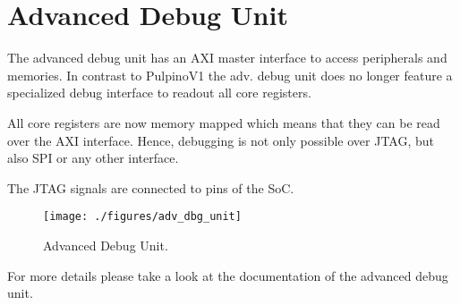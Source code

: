 \chapter{Advanced Debug Unit}

The advanced debug unit has an AXI master interface to access peripherals and
memories. In contrast to PulpinoV1 the adv. debug unit does no longer feature
 a specialized debug interface to readout all core registers.

All core registers are now memory mapped which means that they can be read over
 the AXI interface. Hence, debugging is not only possible over JTAG, but also SPI
 or any other interface.

The JTAG signals are connected to pins of the SoC.

\begin{figure}[H]
  \centering
  \texttt{[image: ./figures/adv\_dbg\_unit]}
  \caption{Advanced Debug Unit.}
  \label{fig:adv_dbg_unit}
\end{figure}

For more details please take a look at the documentation of the advanced debug unit.


